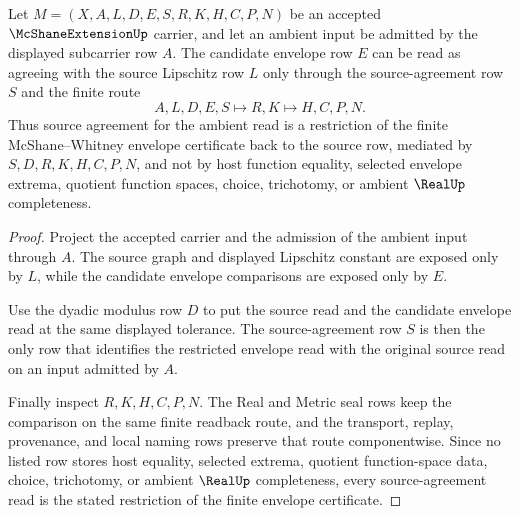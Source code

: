 \begin{theorem}
\label{thm:mcshane-extension-source-agreement-envelope}
Let $M=(X,A,L,D,E,S,R,K,H,C,P,N)$ be an accepted $\McShaneExtensionUp$ carrier, and let an ambient input be admitted by the displayed subcarrier row $A$. The candidate envelope row $E$ can be read as agreeing with the source Lipschitz row $L$ only through the source-agreement row $S$ and the finite route
$$
A,L,D,E,S\longmapsto R,K\longmapsto H,C,P,N .
$$
Thus source agreement for the ambient read is a restriction of the finite McShane--Whitney envelope certificate back to the source row, mediated by $S,D,R,K,H,C,P,N$, and not by host function equality, selected envelope extrema, quotient function spaces, choice, trichotomy, or ambient $\RealUp$ completeness.
\end{theorem}
\begin{proof}
Project the accepted carrier and the admission of the ambient input through $A$. The source graph and displayed Lipschitz constant are exposed only by $L$, while the candidate envelope comparisons are exposed only by $E$.

Use the dyadic modulus row $D$ to put the source read and the candidate envelope read at the same displayed tolerance. The source-agreement row $S$ is then the only row that identifies the restricted envelope read with the original source read on an input admitted by $A$.

Finally inspect $R,K,H,C,P,N$. The Real and Metric seal rows keep the comparison on the same finite readback route, and the transport, replay, provenance, and local naming rows preserve that route componentwise. Since no listed row stores host equality, selected extrema, quotient function-space data, choice, trichotomy, or ambient $\RealUp$ completeness, every source-agreement read is the stated restriction of the finite envelope certificate.
\end{proof}

